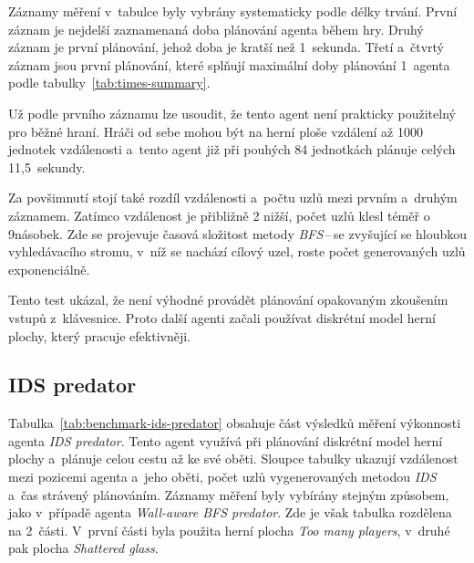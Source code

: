 Záznamy měření v~tabulce byly vybrány systematicky podle délky trvání. První záznam je nejdelší zaznamenaná doba plánování agenta během hry. Druhý záznam je první plánování, jehož doba je kratší než 1~sekunda. Třetí a~čtvrtý záznam jsou první plánování, které splňují maximální doby plánování 1~agenta podle tabulky~\ref{tab:times-summary}.

Už podle prvního záznamu lze usoudit, že tento agent není prakticky použitelný pro běžné hraní. Hráči od sebe mohou být na herní ploše vzdálení až 1000 jednotek vzdálenosti a~tento agent již při pouhých 84 jednotkách plánuje celých 11,5~sekundy.

Za povšimnutí stojí také rozdíl vzdálenosti a~počtu uzlů mezi prvním a~druhým záznamem. Zatímco vzdálenost je přibližně 2\texttimes{} nižší, počet uzlů klesl téměř o 9násobek. Zde se projevuje časová složitost metody \emph{BFS}\,--\,se zvyšující se hloubkou vyhledávacího stromu, v~níž se nachází cílový uzel, roste počet generovaných uzlů exponenciálně.

Tento test ukázal, že není výhodné provádět plánování opakovaným zkoušením vstupů z~klávesnice. Proto další agenti začali používat diskrétní model herní plochy, který pracuje efektivněji.

\subsection*{IDS predator}

Tabulka~\ref{tab:benchmark-ids-predator} obsahuje část výsledků měření výkonnosti agenta \emph{IDS predator}. Tento agent využívá při plánování diskrétní model herní plochy a~plánuje celou cestu až ke své oběti. Sloupce tabulky ukazují vzdálenost mezi pozicemi agenta a~jeho oběti, počet uzlů vygenerovaných metodou \emph{IDS} a~čas strávený plánováním. Záznamy měření byly vybírány stejným způsobem, jako v~případě agenta \emph{Wall-aware BFS predator}. Zde je však tabulka rozdělena na 2~části. V~první části byla použita herní plocha  \emph{Too many players}, v~druhé pak plocha \emph{Shattered glass}.

